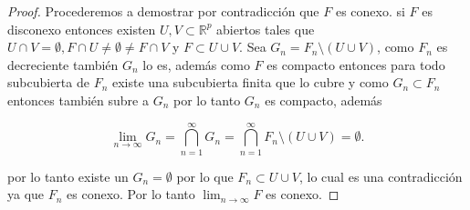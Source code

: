 \documentclass[letterpaper]{article}
\theoremstyle{definition}
\theoremstyle{lemathm}
\theoremstyle{lemathm}
\theoremstyle{lemathm}
\theoremstyle{lemademthm}
\newcommand{\limtoinf}[1]{\lim_{#1\to\infty}}
\newcommand{\pars}[1]{\left( #1 \right) }
\newcommand{\RR}{\mathbb{R}}
\newcommand{\1}{\mathbbm{1}}
\begin{document}
\begin{enumerate}
\begin{proof}
			Procederemos a demostrar por contradicción que $F$ es conexo. si $F$ es disconexo entonces existen $U,V\subset \RR^p$ abiertos tales que $U\cap V = \emptyset, F\cap U \neq \emptyset \neq F\cap V$ y $F \subset U\cup V$. Sea $G_n = F_n\setminus\pars{U\cup V}$, como $F_n$ es decreciente también $G_n$ lo es, además como $F$ es compacto entonces para todo subcubierta de $F_n$ existe una subcubierta finita que lo cubre y como $G_n \subset F_n$ entonces también subre a $G_n$ por lo tanto $G_n$ es compacto, además

			\[\limtoinf{n} G_n = \bigcap_{n=1}^{\infty} G_n = \bigcap_{n=1}^{\infty} F_n\setminus\pars{U\cup V} = \emptyset.\]

			por lo tanto existe un $G_n = \emptyset$ por lo que $F_n \subset U\cup V$, lo cual es una contradicción ya que $F_n$ es conexo. Por lo tanto $\limtoinf{n} F$ es conexo.
		\end{proof}

	\end{enumerate}
\end{document}
